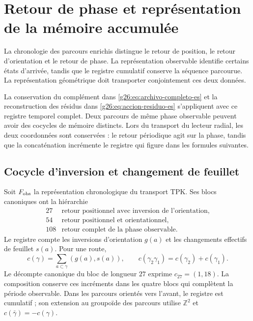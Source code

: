 
\section{Retour de phase et représentation de la mémoire accumulée}
\label{vii:sec:retorno-memoria-gravedad}

La chronologie des parcours enrichis distingue le retour de position, le retour d'orientation et le retour de phase. La représentation observable identifie certains états d'arrivée, tandis que le registre cumulatif conserve la séquence parcourue. La représentation géométrique doit transporter conjointement ces deux données.

La conservation du complément dans \eqref{g26:eq:archivo-completo-es} et la reconstruction des résidus dans \eqref{g26:eq:accion-residuo-es} s'appliquent avec ce registre temporel complet. Deux parcours de même phase observable peuvent avoir des cocycles de mémoire distincts. Lors du transport du lecteur radial, les deux coordonnées sont conservées : le retour périodique agit sur la phase, tandis que la concaténation incrémente le registre qui figure dans les formules suivantes.

\subsection{Cocycle d'inversion et changement de feuillet}
\label{vii:subsec:cociclo-memoria}

Soit \(F_{\rm obs}\) la représentation chronologique du transport TPK.
Ses blocs canoniques ont la hiérarchie
\[
\begin{array}{c|l}
27&\text{retour positionnel avec inversion de l’orientation},\\
54&\text{retour positionnel et orientationnel},\\
108&\text{retour complet de la phase observable}.
\end{array}
\]
Le registre compte les inversions d'orientation \(g(a)\) et les
changements effectifs de feuillet \(s(a)\). Pour une route,
\begin{equation}
 c(\gamma)=\sum_{a\subset\gamma}(g(a),s(a)),\qquad
 c(\gamma_2\gamma_1)=c(\gamma_2)+c(\gamma_1).
 \label{vii:eq:cociclo-ruta}
\end{equation}
Le décompte canonique du bloc de longueur \(27\) exprime \(c_{27}=(1,18)\). La composition conserve ces incréments dans les quatre blocs qui complètent la période observable. Dans les parcours orientés vers l'avant, le registre est cumulatif ; son extension au groupoïde des parcours utilise \(\mathbb Z^2\) et \(c(\bar\gamma)=-c(\gamma)\).

